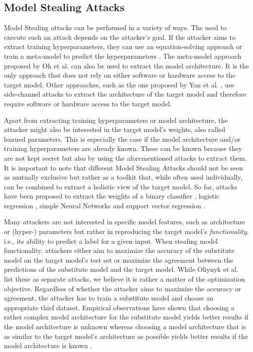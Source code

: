 \subsection{Model Stealing Attacks}
\label{sec:ModelStealing:Attacks}
Model Stealing attacks can be performed in a variety of ways. The used to execute such an attack depends on the attacker's goal. If the attacker
aims to extract training hyperparameters, they can use an equation-solving approach \cite{wang2018stealing} or train a meta-model to predict the hyperparameters
\cite{oh2019towards}. The meta-model approach proposed by Oh et al. can also be used to extract the model architecture. It is the only approach that does not rely on either
software or hardware access to the target model. Other approaches, such as the one proposed by Yan et al. \cite{yan2020cache}, use side-channel attacks to extract
the architecture of the target model and therefore require software or hardware access to the target model. \par
Apart from extracting training hyperparameters or model architecture, the attacker might also be interested in the target model's weights, also called learned parameters. This
is especially the case if the model architecture and/or training hyperparameters are already known. These can be known because they are not kept secret but also by using the 
aforementioned attacks to extract them. It is important to note that different Model Stealing Attacks should not be seen as mutually exclusive but rather as a toolkit that,
while often used individually, can be combined to extract a holistic view of the target model. So far, attacks have been proposed to extract the weights of a binary classifier
\cite{lowd2005adversarial}, logistic regression \cite{tramer2016stealing}, simple Neural Networks \cite{tramer2016stealing} and support vector regression \cite{reith2019efficiently}. \par
Many attackers are not interested in specific model features, such as architecture or (hyper-) parameters but rather in reproducing the target model's \textit{functionality}, i.e.,
its ability to predict a label for a given input. When stealing model functionality, attackers either aim to maximize the accuracy of the substitute model on the target model's
test set or maximize the agreement between the predictions of the substitute model and the target model. While Oliynyk et al. list these as separate attacks, we believe it is
rather a matter of the optimization objective. Regardless of whether the attacker aims to maximize the accuracy or agreement, the attacker has to train a substitute model
and choose an appropriate thief dataset. Empirical observations have shown that choosing a rather complex model architecture for the substitute model yields better results if the
model architecture is unknown whereas choosing a model architecture that is as similar to the target model's architecture as possible yields better results if the model architecture
is known \cite{orekondy2019knockoff} \cite{pal2020activethief}. \par

